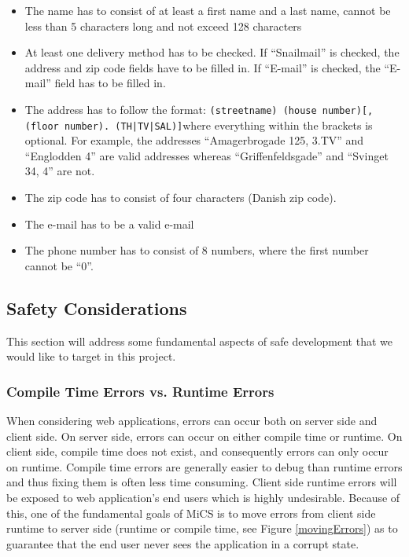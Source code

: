 		\begin{itemize}
			\item The name has to consist of at least a first name and a last name, cannot be less than 5 characters long and not exceed 128 characters
			\item At least one delivery method has to be checked. If “Snailmail” is checked, the address and zip code fields have to be filled in. If “E-mail” is checked, the “E-mail” field has to be filled in.
			\item The address has to follow the format: \newline\newline \texttt{(streetname) (house number)[, (floor number). (TH|TV|SAL)]}\newline\newline where everything within the brackets is optional. For example, the addresses ``Amagerbrogade 125, 3.TV'' and ``Englodden 4'' are valid addresses whereas ``Griffenfeldsgade'' and ``Svinget 34, 4'' are not.
			\item The zip code has to consist of four characters (Danish zip code).
			\item The e-mail has to be a valid e-mail
			\item The phone number has to consist of 8 numbers, where the first number cannot be “0”.
		\end{itemize}


	\subsection{Safety Considerations} %
	\label{sub:safety_considerations}
		This section will address some fundamental aspects of safe development that we would like to target in this project.

		\subsubsection{Compile Time Errors vs. Runtime Errors} %
		\label{ssub:compile_time_errors_vs_runtime_errors}
			
			When considering web applications, errors can occur both on server side and client side. On server side, errors can occur on either compile time or runtime. On client side, compile time does not exist, and consequently errors can only occur on runtime.
			Compile time errors are generally easier to debug than runtime errors and thus fixing them is often less time consuming. Client side runtime errors will be exposed to web application's end users which is highly undesirable. Because of this, one of the fundamental goals of MiCS is to move errors from client side runtime to server side (runtime or compile time, see Figure \ref{movingErrors}) as to guarantee that the end user never sees the application in a corrupt state.

